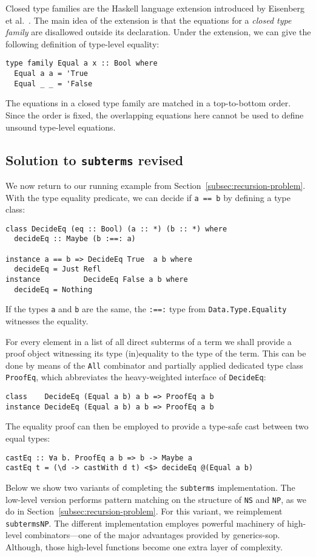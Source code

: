 \documentclass[runningheads]{llncs}
\newcommand{\K}[1]{\lstinline{#1}}
\begin{document}
Closed type families are the Haskell language extension introduced by Eisenberg et al.~\cite{Eisenberg2014}. The main idea of the extension is that the equations for a \emph{closed type family} are disallowed outside its declaration. Under the extension, we can give the following definition of type-level equality:
\begin{lstlisting}
type family Equal a x :: Bool where
  Equal a a = 'True
  Equal _ _ = 'False
\end{lstlisting}
The equations in a closed type family are matched in a top-to-bottom order. Since the order is fixed, the overlapping equations here cannot be used to define unsound type-level equations.

\subsection{Solution to \K{subterms} revised}
\label{subsec:solve-subterms}

We now return to our running example from Section~\ref{subsec:recursion-problem}. With the type equality predicate, we can decide if \K{a == b} by defining a type class:
\begin{lstlisting}
class DecideEq (eq :: Bool) (a :: *) (b :: *) where
  decideEq :: Maybe (b :==: a)

instance a == b => DecideEq True  a b where
  decideEq = Just Refl
instance          DecideEq False a b where
  decideEq = Nothing
\end{lstlisting}
If the types \K{a} and \K{b} are the same, the \K{:==:} type from \K{Data.Type.Equality} witnesses the equality.

For every element in a list of all direct subterms of a term we shall provide a proof object witnessing its type (in)equality to the type of the term. This can be done by means of the \K{All} combinator and partially applied dedicated type class \K{ProofEq}, which abbreviates the heavy-weighted interface of \K{DecideEq}:
\begin{lstlisting}
class    DecideEq (Equal a b) a b => ProofEq a b
instance DecideEq (Equal a b) a b => ProofEq a b
\end{lstlisting}
The equality proof can then be employed to provide a type-safe cast between two equal types:
\begin{lstlisting}
castEq :: ∀a b. ProofEq a b => b -> Maybe a
castEq t = (\d -> castWith d t) <$> decideEq @(Equal a b)
\end{lstlisting}

Below we show two variants of completing the \K{subterms} implementation. The low-level version performs pattern matching on the structure of \K{NS} and \K{NP}, as we do in Section~\ref{subsec:recursion-problem}. For this variant, we reimplement \K{subtermsNP}. The different implementation employes powerful machinery of high-level combinators---one of the major advantages provided by \textsf{generics-sop}. Although, those high-level functions become one extra layer of complexity.
\end{document}
